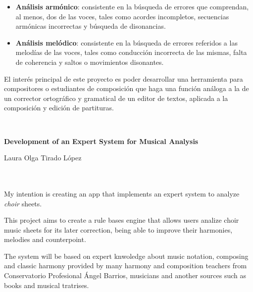 \documentclass[a4paper, 12pt]{report} %
\numberwithin{equation}{section} %
\numberwithin{figure}{section} %
\numberwithin{table}{section} %
\begin{document}
\begin{itemize}
	\item \textbf{Análisis armónico}: consistente en la búsqueda de errores que comprendan, al menos, dos de las voces, tales como acordes incompletos, secuencias armónicas incorrectas y búsqueda de disonancias.
	\item  \textbf{Análisis melódico}: consistente en la búsqueda de errores referidos a las melodías de las voces, tales como conducción incorrecta de las mismas, falta de coherencia y saltos o movimientos disonantes. 
\end{itemize}

\bigskip

El interés principal de este proyecto es poder desarrollar una herramienta para compositores o estudiantes de composición que haga una función análoga a la de un corrector ortográfico y gramatical de un editor de textos, aplicada a la composición y edición de partituras.

\cleardoublepage
\newpage
\thispagestyle{empty}
\

\begin{center}
{\large\bfseries Development of an Expert System for Musical Analysis}\\
\end{center}
\begin{center}
Laura Olga Tirado López\\
\end{center}

\\

\vspace{0.7cm}
\\

My intention is creating an app that implements an expert system to analyze \textit{choir} sheets.

\bigskip

This project aims to create a rule bases engine that allows users analize choir music sheets for its later correction, being able to improve their harmonies, melodies and counterpoint.

\bigskip

The system will be based on expert knwoledge about music notation, composing and classic harmony provided by many harmony and composition teachers from Conservatorio Profesional Ángel Barrios, musicians and another sources such as books and musical tratrises.
\end{document}
